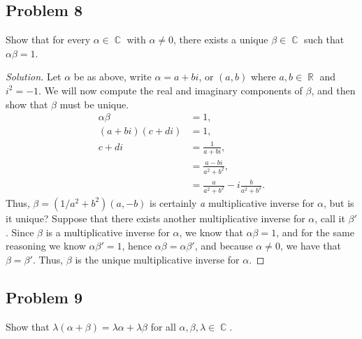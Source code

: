 \documentclass[letterpaper, 12pt]{amsart}
\DeclareMathOperator{\R}{\mathbb{R}}
\DeclareMathOperator{\C}{\mathbb{C}}
\theoremstyle{definition}  %
\begin{document}
		\subsection*{Problem 8}
		Show that for every $\alpha \in \C$ with $\alpha \neq 0$, there exists a unique $\beta \in \C$ such that $\alpha \beta = 1$.

		\begin{proof}[Solution]
		Let $\alpha$ be as above, write $\alpha = a + bi$, or $(a,b)$ where $a,b \in \R$ and $i^{2} = -1$.
		We will now compute the real and imaginary components of $\beta$, and then show that $\beta$ must be unique.
			\begin{align*}
			\alpha \beta &= 1, \\
			(a + bi)(c + di) &= 1, \\
			c + di &= \frac{1}{a + bi}, \\
			&= \frac{a - bi}{a^{2} + b^{2}}, \\
			&= \frac{a}{a^{2} + b^{2}} - i\frac{b}{a^{2} + b^{2}}.
			\end{align*}
		Thus, $\beta = (1/a^{2} + b^{2})(a,-b)$ is certainly \textit{a} multiplicative inverse for $\alpha$, but is it unique?
		Suppose that there exists another multiplicative inverse for $\alpha$, call it $\beta'$.
		Since $\beta$ is a multiplicative inverse for $\alpha$, we know that $\alpha \beta = 1$, and for the same reasoning we know $\alpha \beta' = 1$, hence $\alpha \beta = \alpha \beta'$, and because $\alpha \neq 0$, we have that $\beta = \beta'$.
		Thus, $\beta$ is the unique multiplicative inverse for $\alpha$.	
		\end{proof}

		\subsection*{Problem 9}
		Show that $\lambda(\alpha + \beta) = \lambda \alpha + \lambda \beta$ for all $\alpha, \beta, \lambda \in \C$.
\end{document}

